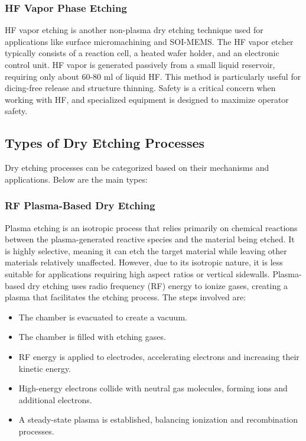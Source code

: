 \documentclass{report}
\begin{document}
\subsubsection{HF Vapor Phase Etching}
HF vapor etching is another non-plasma dry etching technique used for applications like surface micromachining and SOI-MEMS. The HF vapor etcher typically consists of a reaction cell, a heated wafer holder, and an electronic control unit. HF vapor is generated passively from a small liquid reservoir, requiring only about 60-80 ml of liquid HF. This method is particularly useful for dicing-free release and structure thinning. Safety is a critical concern when working with HF, and specialized equipment is designed to maximize operator safety.


\subsection{Types of Dry Etching Processes}

Dry etching processes can be categorized based on their mechanisms and applications. Below are the main types:

\subsubsection{RF Plasma-Based Dry Etching}

Plasma etching is an isotropic process that relies primarily on chemical reactions between the plasma-generated reactive species and the material being etched. It is highly selective, meaning it can etch the target material while leaving other materials relatively unaffected. However, due to its isotropic nature, it is less suitable for applications requiring high aspect ratios or vertical sidewalls.
Plasma-based dry etching uses radio frequency (RF) energy to ionize gases, creating a plasma that facilitates the etching process. The steps involved are:
\begin{itemize}
    \item The chamber is evacuated to create a vacuum.
    \item The chamber is filled with etching gases.
    \item RF energy is applied to electrodes, accelerating electrons and increasing their kinetic energy.
    \item High-energy electrons collide with neutral gas molecules, forming ions and additional electrons.
    \item A steady-state plasma is established, balancing ionization and recombination processes.
\end{itemize}
\end{document}
